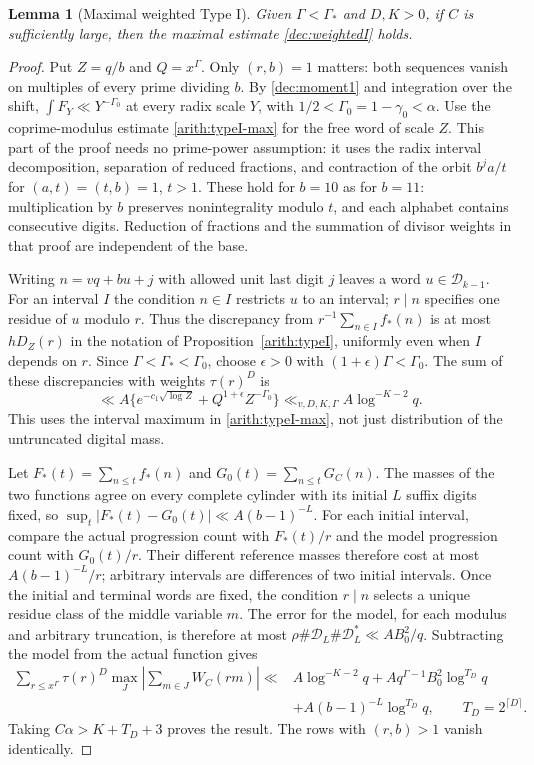 \documentclass[11pt,a4paper]{article}
\theoremstyle{paperplain}
\newtheorem{lemma}[theorem]{Lemma}
\numberwithin{equation}{section}
\begin{document}
\begin{lemma}[Maximal weighted Type I]\label{dec:typeI}
Given $\Gamma<\Gamma_*$ and $D,K>0$, if $C$ is sufficiently
large, then the maximal estimate \eqref{dec:weightedI} holds.
\end{lemma}
\begin{proof}
Put $Z=q/b$ and $Q=x^\Gamma$. Only $(r,b)=1$ matters: both
sequences vanish on multiples of every prime dividing $b$. By
\eqref{dec:moment1} and integration over the shift,
$\int F_Y\ll Y^{-\Gamma_0}$ at every radix scale $Y$, with
$1/2<\Gamma_0=1-\gamma_0<\alpha$. Use the coprime-modulus estimate
\eqref{arith:typeI-max} for the free word of scale $Z$. This part of
the proof needs no prime-power assumption: it uses the radix interval decomposition,
separation of reduced fractions, and contraction of the orbit $b^j a/t$
for $(a,t)=(t,b)=1$, $t>1$. These hold for $b=10$ as for $b=11$:
multiplication by $b$ preserves nonintegrality modulo $t$, and each
alphabet contains consecutive digits. Reduction of fractions and the
summation of divisor weights in that proof are independent of the base.

Writing $n=vq+bu+j$ with allowed unit last digit $j$ leaves a word
$u\in\mathcal D_{k-1}$. For an interval $I$ the condition $n\in I$
restricts $u$ to an interval; $r\mid n$ specifies one residue of $u$
modulo $r$. Thus the discrepancy from $r^{-1}\sum_{n\in I}f_*(n)$
is at most $hD_Z(r)$ in the notation of Proposition~\ref{arith:typeI},
uniformly even when $I$ depends on $r$. Since
$\Gamma<\Gamma_*<\Gamma_0$, choose $\epsilon>0$ with
$(1+\epsilon)\Gamma<\Gamma_0$. The sum of these discrepancies with
weights $\tau(r)^D$ is
\[
 \ll A\{e^{-c_1\sqrt{\log Z}}+Q^{1+\epsilon}Z^{-\Gamma_0}\}
 \ll_{v,D,K,\Gamma} A\log^{-K-2}q.
\]
This uses the interval maximum in \eqref{arith:typeI-max}, not just
distribution of the untruncated digital mass.

Let $F_*(t)=\sum_{n\le t}f_*(n)$ and
$G_0(t)=\sum_{n\le t}G_C(n)$.
The masses of the two functions agree on every complete cylinder with
its initial $L$ suffix digits fixed, so
$\sup_t|F_*(t)-G_0(t)|\ll A(b-1)^{-L}$.
For each initial interval, compare the actual progression count with
$F_*(t)/r$ and the model progression count with $G_0(t)/r$.
Their different reference masses therefore cost at most
$A(b-1)^{-L}/r$; arbitrary intervals are differences of two
initial intervals.
Once the initial and terminal words are fixed, the condition $r\mid n$
selects a unique residue class of the middle variable $m$.
The error for the model, for each modulus and arbitrary truncation,
is therefore at most
$\rho\#\mathcal D_L\#\mathcal D_L^*\ll AB_0^2/q$.
Subtracting the model from the actual function gives
\begin{align*}
 \sum_{r\le x^\Gamma}\tau(r)^D\max_J
 \left|\sum_{m\in J}W_C(rm)\right|
 \ll{}&A\log^{-K-2}q
   +Aq^{\Gamma-1}B_0^2\log^{T_D}q\\
 &+A(b-1)^{-L}\log^{T_D}q,\qquad T_D=2^{\lceil D\rceil}.
\end{align*}
Taking $C\alpha>K+T_D+3$ proves the result.
The rows with $(r,b)>1$ vanish identically.
\end{proof}
\end{document}
